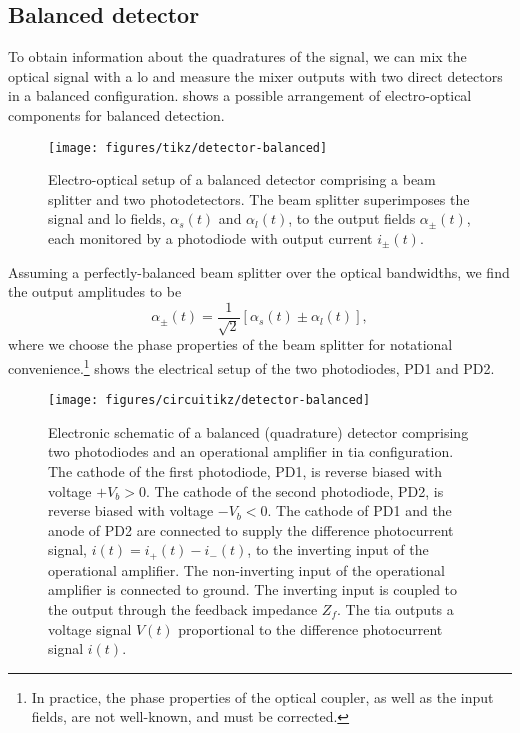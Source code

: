 \FloatBarrier
\subsection{Balanced detector}

To obtain information about the quadratures of the signal, we can mix the optical signal with a \gls{lo} and measure the mixer outputs with two direct detectors in a balanced configuration.
 shows a possible arrangement of electro-optical components for balanced detection.
\begin{figure}[htb]
    \centering
    \texttt{[image: figures/tikz/detector-balanced]}
    \caption{Electro-optical setup of a balanced detector comprising a beam splitter and two photodetectors. The beam splitter superimposes the signal and \gls{lo} fields, $\alpha_s(t)$ and $\alpha_l(t)$, to the output fields $\alpha_\pm(t)$, each monitored by a photodiode with output current $i_\pm(t)$.}\label{fig:detector_balanced_optics}
\end{figure}
Assuming a perfectly-balanced beam splitter over the optical bandwidths, we find the output amplitudes to be
\begin{equation}
	\alpha_\pm(t)
	=
	\frac{1}{\sqrt{2}}
	\left[
		\alpha_s(t)
		\pm
		\alpha_l(t)
	\right]
	\label{eq:detector_balanced_amplitudes}
	,
\end{equation}
where we choose the phase properties of the beam splitter for notational convenience.\footnote{In practice, the phase properties of the optical coupler, as well as the input fields, are not well-known, and must be corrected.}
 shows the electrical setup of the two photodiodes, PD1 and PD2.
\begin{figure}[htb]
    \centering
    \texttt{[image: figures/circuitikz/detector-balanced]}
    \caption{Electronic schematic of a balanced (quadrature) detector comprising two photodiodes and an operational amplifier in \gls{tia} configuration. The cathode of the first photodiode, PD1, is reverse biased with voltage $+V_b>0$. The cathode of the second photodiode, PD2, is reverse biased with voltage $-V_b<0$. The cathode of PD1 and the anode of PD2 are connected to supply the difference photocurrent signal, $i(t)=i_+(t)-i_-(t)$, to the inverting input of the operational amplifier. The non-inverting input of the operational amplifier is connected to ground. The inverting input is coupled to the output through the feedback impedance $Z_f$. The \gls{tia} outputs a voltage signal $V(t)$ proportional to the difference photocurrent signal $i(t)$.}\label{fig:detector_balanced_electronics}
\end{figure}
